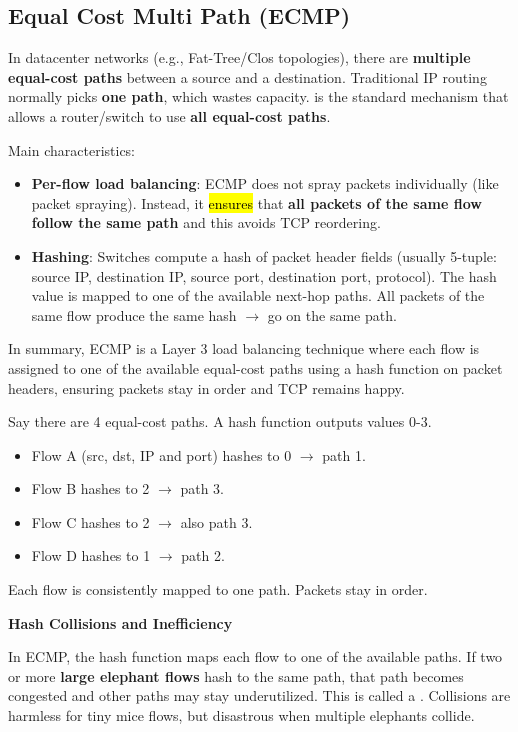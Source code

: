 \subsection{Equal Cost Multi Path (ECMP)}\label{subsection: Equal Cost Multi Path (ECMP)}

In datacenter networks (e.g., Fat-Tree/Clos topologies), there are \textbf{multiple equal-cost paths} between a source and a destination. Traditional IP routing normally picks \textbf{one path}, which wastes capacity.  is the standard mechanism that allows a router/switch to use \textbf{all equal-cost paths}.

\highspace
Main characteristics:
\begin{itemize}
    \item \textbf{Per-flow load balancing}: ECMP does not spray packets individually (like packet spraying). Instead, it \hl{ensures} that \textbf{all packets of the same flow follow the same path} and this avoids TCP reordering.
    \item \textbf{Hashing}: Switches compute a hash of packet header fields (usually 5-tuple: source IP, destination IP, source port, destination port, protocol). The hash value is mapped to one of the available next-hop paths. All packets of the same flow produce the same hash $\rightarrow$ go on the same path.
\end{itemize}
In summary, ECMP is a Layer 3 load balancing technique where each flow is assigned to one of the available equal-cost paths using a hash function on packet headers, ensuring packets stay in order and TCP remains happy.

\begin{examplebox}
    Say there are 4 equal-cost paths. A hash function outputs values 0-3.
    \begin{itemize}
        \item Flow A (src, dst, IP and port) hashes to 0 $\rightarrow$ path 1.
        \item Flow B hashes to 2 $\rightarrow$ path 3.
        \item Flow C hashes to 2 $\rightarrow$ also path 3.
        \item Flow D hashes to 1 $\rightarrow$ path 2.
    \end{itemize}
    Each flow is consistently mapped to one path. Packets stay in order.
\end{examplebox}

\highspace
\begin{flushleft}
    \textcolor{Red2}{ \textbf{Hash Collisions and Inefficiency}}
\end{flushleft}
In ECMP, the hash function maps each flow to one of the available paths. If two or more \textbf{large elephant flows} hash to the same path, that path becomes congested and other paths may stay underutilized. This is called a . Collisions are harmless for tiny mice flows, but disastrous when multiple elephants collide.

